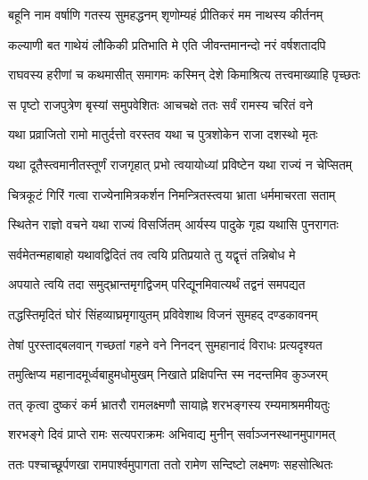 
\textlink{}
\translink{}

\storymeta


\twolineshloka
{बहूनि नाम वर्षाणि गतस्य सुमहद्धनम्}
{शृणोम्यहं प्रीतिकरं मम नाथस्य कीर्तनम्}

\twolineshloka
{कल्याणी बत गाथेयं लौकिकी प्रतिभाति मे}
{एति जीवन्तमानन्दो नरं वर्षशतादपि}

\twolineshloka
{राघवस्य हरीणां च कथमासीत् समागमः}
{कस्मिन् देशे किमाश्रित्य तत्त्वमाख्याहि पृच्छतः}

\twolineshloka
{स पृष्टो राजपुत्रेण बृस्यां समुपवेशितः}
{आचचक्षे ततः सर्वं रामस्य चरितं वने}

\twolineshloka
{यथा प्रव्राजितो रामो मातुर्दत्तो वरस्तव}
{यथा च पुत्रशोकेन राजा दशस्थो मृतः}

\twolineshloka
{यथा दूतैस्त्वमानीतस्तूर्णं राजगृहात् प्रभो}
{त्वयायोध्यां प्रविष्टेन यथा राज्यं न चेप्सितम्}

\twolineshloka
{चित्रकूटं गिरिं गत्वा राज्येनामित्रकर्शन}
{निमन्त्रितस्त्वया भ्राता धर्ममाचरता सताम्}

\twolineshloka
{स्थितेन राज्ञो वचने यथा राज्यं विसर्जितम्}
{आर्यस्य पादुके गृह्य यथासि पुनरागतः}

\twolineshloka
{सर्वमेतन्महाबाहो यथावद्विदितं तव}
{त्वयि प्रतिप्रयाते तु यद्वृत्तं तन्निबोध मे}


\twolineshloka
{अपयाते त्वयि तदा समुद्भ्रान्तमृगद्विजम्}
{परिद्यूनमिवात्यर्थं तद्वनं समपद्यत}

\twolineshloka
{तद्धस्तिमृदितं घोरं सिंहव्याघ्रमृगायुतम्}
{प्रविवेशाथ विजनं सुमहद् दण्डकावनम्}

\twolineshloka
{तेषां पुरस्ताद्बलवान् गच्छतां गहने वने}
{निनदन् सुमहानादं विराधः प्रत्यदृश्यत}

\twolineshloka
{तमुत्क्षिप्य महानादमूर्ध्वबाहुमधोमुखम्}
{निखाते प्रक्षिपन्ति स्म नदन्तमिव कुञ्जरम्}

\twolineshloka
{तत् कृत्वा दुष्करं कर्म भ्रातरौ रामलक्ष्मणौ}
{सायाह्ने शरभङ्गस्य रम्यमाश्रममीयतुः}

\twolineshloka
{शरभङ्गे दिवं प्राप्ते रामः सत्यपराक्रमः}
{अभिवाद्य मुनीन् सर्वाञ्जनस्थानमुपागमत्}

\twolineshloka
{ततः पश्चाच्छूर्पणखा रामपार्श्वमुपागता}
{ततो रामेण सन्दिष्टो लक्ष्मणः सहसोत्थितः}

